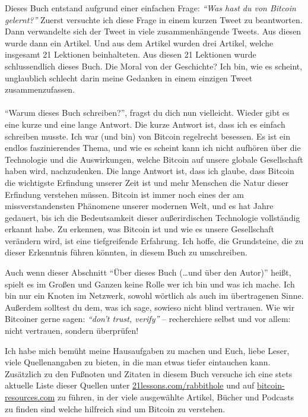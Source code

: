 Dieses Buch entstand aufgrund einer einfachen Frage: \textit{\enquote{Was hast
du von Bitcoin gelernt?}} Zuerst versuchte ich diese Frage in einem kurzen Tweet
zu beantworten. Dann verwandelte sich der Tweet in viele zusammenhängende
Tweets. Aus diesen wurde dann ein Artikel. Und aus dem Artikel wurden drei
Artikel, welche insgesamt 21 Lektionen beinhalteten. Aus diesen 21 Lektionen
wurde schlussendlich dieses Buch. Die Moral von der Geschichte? Ich bin, wie es
scheint,  unglaublich schlecht darin meine Gedanken in einem einzigen Tweet
zusammenzufassen.

\paragraph{}
\enquote{Warum dieses Buch schreiben?}, fragst du dich nun vielleicht. Wieder
gibt es eine kurze und eine lange Antwort. Die kurze Antwort ist, dass ich es
einfach schreiben musste. Ich war (und bin) von Bitcoin regelrecht besessen. Es
ist ein endlos faszinierendes Thema, und wie es scheint kann ich nicht aufhören
über die Technologie und die Auswirkungen, welche Bitcoin auf unsere globale
Gesellschaft haben wird, nachzudenken. Die lange Antwort ist, dass ich glaube,
dass Bitcoin die wichtigste Erfindung unserer Zeit ist und mehr Menschen die
Natur dieser Erfindung verstehen müssen. Bitcoin ist immer noch eines der am
missverstandensten Phänomene unserer modernen Welt, und es hat Jahre
gedauert, bis ich die Bedeutsamkeit dieser außerirdischen Technologie vollständig
erkannt habe. Zu erkennen, was Bitcoin ist und wie es unsere Gesellschaft
verändern wird, ist eine tiefgreifende Erfahrung. Ich hoffe, die Grundsteine, die zu
dieser Erkenntnis führen könnten, in diesem Buch zu umschreiben.

Auch wenn dieser Abschnitt \enquote{Über dieses Buch (\ldots und über den
Autor)} heißt, spielt es im Großen und Ganzen keine Rolle wer ich bin und was
ich mache. Ich bin nur ein Knoten im Netzwerk, sowohl wörtlich als auch im
übertragenen Sinne. Außerdem solltest du dem, was ich sage, sowieso nicht blind
vertrauen. Wie wir Bitcoiner gerne sagen: \textit{\enquote{don't trust, verify}}
-- recherchiere selbst und vor allem: nicht vertrauen, sondern überprüfen!

Ich habe mich bemüht meine Hausaufgaben zu machen und Euch, liebe Leser, viele
Quellenangaben zu bieten, in die man etwas tiefer eintauchen kann. Zusätzlich zu
den Fußnoten und Zitaten in diesem Buch versuche ich eine stets aktuelle Liste
dieser Quellen unter
\href{https://21lessons.com/rabbithole}{21lessons.com/rabbithole} und auf
\href{https://bitcoin-resources.com}{bitcoin-resources.com} zu führen, in der
viele ausgewählte Artikel, Bücher und Podcasts zu finden sind welche hilfreich
sind um Bitcoin zu verstehen.

